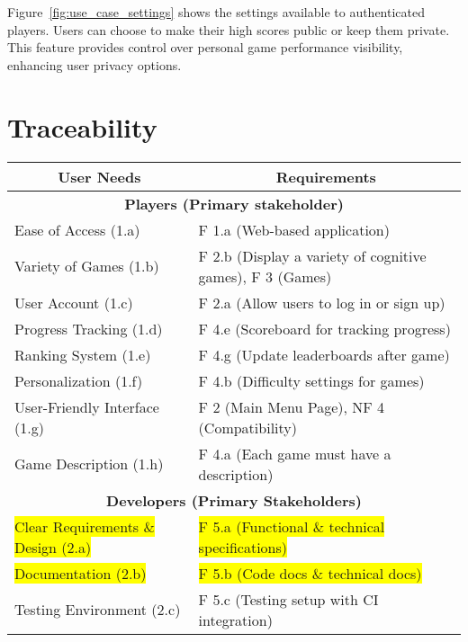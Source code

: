 \documentclass[11pt,a4paper]{article}
\begin{document}
Figure~\ref{fig:use_case_settings} shows the settings available to
authenticated players. Users can choose to make their high scores public
or keep them private. This feature provides control over personal game
performance visibility, enhancing user privacy options.


\section{Traceability}
\begin{table}[H]
\begin{tabular}{|l|l|}
\hline
\multicolumn{1}{|c|}{\textbf{User Needs}}    & \multicolumn{1}{|c|}{\textbf{Requirements}}                   \\ \hline
\multicolumn{2}{|c|}{\textbf{Players (Primary stakeholder)}}                                           \\ \hline
Ease of Access (1.a)                         & F 1.a (Web-based application)                \\
Variety of Games (1.b)                       & F 2.b (Display a variety of cognitive games), F 3 (Games) \\
User Account (1.c)                           & F 2.a (Allow users to log in or sign up)     \\
Progress Tracking (1.d)                      & F 4.e (Scoreboard for tracking progress)     \\
Ranking System (1.e)                         & F 4.g (Update leaderboards after game)       \\
Personalization (1.f)                        & F 4.b (Difficulty settings for games)        \\
User-Friendly Interface (1.g)                & F 2 (Main Menu Page), NF 4 (Compatibility)   \\
Game Description (1.h)                       & F 4.a (Each game must have a description)    \\
\hline
\multicolumn{2}{|c|}{\textbf{Developers (Primary Stakeholders)}}                                       \\
\hline
\colorbox{yellow}{Clear Requirements \& Design (2.a)}           & \colorbox{yellow}{F 5.a (Functional \& technical specifications)} \\
\colorbox{yellow}{Documentation (2.b)   }                       & \colorbox{yellow}{F 5.b (Code docs \& technical docs)  }        \\
Testing Environment (2.c)                   & 
F 5.c (Testing setup with CI integration)    \\

\end{tabular}
\end{table}
\end{document}
